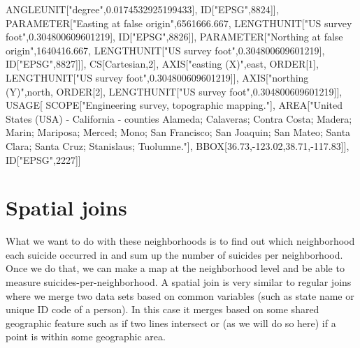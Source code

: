 \documentclass[
]{krantz}
\makeatletter
\newenvironment{Shaded}{\begin{snugshade}}{\end{snugshade}}
\newcommand{\DecValTok}[1]{\textcolor[rgb]{0.06,0.06,0.06}{#1}}
\newcommand{\FloatTok}[1]{\textcolor[rgb]{0.06,0.06,0.06}{#1}}
\newcommand{\NormalTok}[1]{#1}
\newcommand{\SpecialCharTok}[1]{\textcolor[rgb]{0,0,0}{#1}}
\newcommand{\StringTok}[1]{\textcolor[rgb]{0.5,0.5,0.5}{#1}}
\newenvironment{kframe}{%
\medskip{}
\setlength{\fboxsep}{.8em}
 \def\at@end@of@kframe{}%
 \ifinner\ifhmode%
  \def\at@end@of@kframe{\end{minipage}}%
  \begin{minipage}{\columnwidth}%
 \fi\fi%
 \def\FrameCommand##1{\hskip\@totalleftmargin \hskip-\fboxsep
 \colorbox{shadecolor}{##1}\hskip-\fboxsep
     \hskip-\linewidth \hskip-\@totalleftmargin \hskip\columnwidth}%
 \MakeFramed {\advance\hsize-\width
   \@totalleftmargin\z@ \linewidth\hsize
   \@setminipage}}%
 {\par\unskip\endMakeFramed%
 \at@end@of@kframe}
\renewenvironment{Shaded}{\begin{kframe}}{\end{kframe}}
\makeatother
\begin{document}
\begin{Shaded}
\begin{Highlighting}[]
\NormalTok{            ANGLEUNIT[}\StringTok{"degree"}\NormalTok{,}\FloatTok{0.0174532925199433}\NormalTok{],}
\NormalTok{            ID[}\StringTok{"EPSG"}\NormalTok{,}\DecValTok{8824}\NormalTok{]],}
\NormalTok{        PARAMETER[}\StringTok{"Easting at false origin"}\NormalTok{,}\FloatTok{6561666.667}\NormalTok{,}
\NormalTok{            LENGTHUNIT[}\StringTok{"US survey foot"}\NormalTok{,}\FloatTok{0.304800609601219}\NormalTok{],}
\NormalTok{            ID[}\StringTok{"EPSG"}\NormalTok{,}\DecValTok{8826}\NormalTok{]],}
\NormalTok{        PARAMETER[}\StringTok{"Northing at false origin"}\NormalTok{,}\FloatTok{1640416.667}\NormalTok{,}
\NormalTok{            LENGTHUNIT[}\StringTok{"US survey foot"}\NormalTok{,}\FloatTok{0.304800609601219}\NormalTok{],}
\NormalTok{            ID[}\StringTok{"EPSG"}\NormalTok{,}\DecValTok{8827}\NormalTok{]]],}
\NormalTok{    CS[Cartesian,}\DecValTok{2}\NormalTok{],}
\NormalTok{        AXIS[}\StringTok{"easting (X)"}\NormalTok{,east,}
\NormalTok{            ORDER[}\DecValTok{1}\NormalTok{],}
\NormalTok{            LENGTHUNIT[}\StringTok{"US survey foot"}\NormalTok{,}\FloatTok{0.304800609601219}\NormalTok{]],}
\NormalTok{        AXIS[}\StringTok{"northing (Y)"}\NormalTok{,north,}
\NormalTok{            ORDER[}\DecValTok{2}\NormalTok{],}
\NormalTok{            LENGTHUNIT[}\StringTok{"US survey foot"}\NormalTok{,}\FloatTok{0.304800609601219}\NormalTok{]],}
\NormalTok{    USAGE[}
\NormalTok{        SCOPE[}\StringTok{"Engineering survey, topographic mapping."}\NormalTok{],}
\NormalTok{        AREA[}\StringTok{"United States (USA) {-} California {-} counties Alameda; Calaveras; Contra Costa; Madera; Marin; Mariposa; Merced; Mono; San Francisco; San Joaquin; San Mateo; Santa Clara; Santa Cruz; Stanislaus; Tuolumne."}\NormalTok{],}
\NormalTok{        BBOX[}\FloatTok{36.73}\NormalTok{,}\SpecialCharTok{{-}}\FloatTok{123.02}\NormalTok{,}\FloatTok{38.71}\NormalTok{,}\SpecialCharTok{{-}}\FloatTok{117.83}\NormalTok{]],}
\NormalTok{    ID[}\StringTok{"EPSG"}\NormalTok{,}\DecValTok{2227}\NormalTok{]]}
\end{Highlighting}
\end{Shaded}

\hypertarget{spatial-joins}{%
\section{Spatial joins}\label{spatial-joins}}

What we want to do with these neighborhoods is to find out which neighborhood each suicide occurred in and sum up the number of suicides per neighborhood. Once we do that, we can make a map at the neighborhood level and be able to measure suicides-per-neighborhood. A spatial join is very similar to regular joins where we merge two data sets based on common variables (such as state name or unique ID code of a person). In this case it merges based on some shared geographic feature such as if two lines intersect or (as we will do so here) if a point is within some geographic area.
\end{document}
